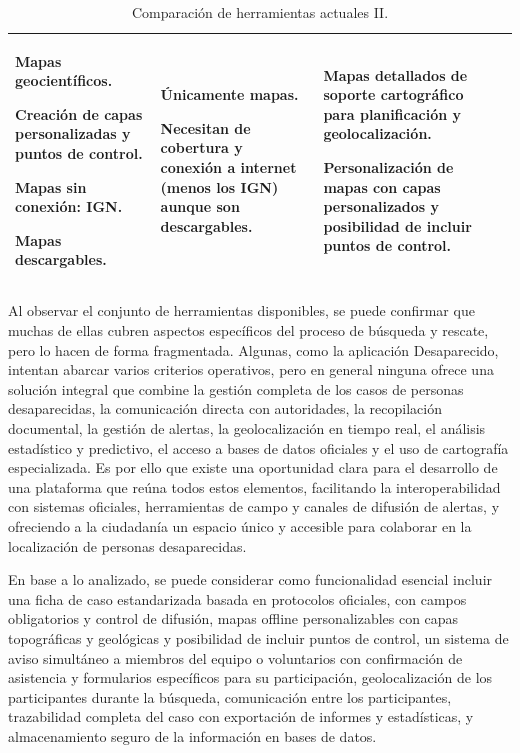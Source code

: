 \begin{table}[htbp]
\begin{tabular}{ |m{2cm}|m{5cm}|m{4cm}|m{3cm}|  }
{    Mapas geocientíficos.
    
    Creación de capas personalizadas y puntos de control.
    
    Mapas sin conexión: IGN.
    
    Mapas descargables.
    } 
    & {Únicamente mapas.
    
    Necesitan de cobertura y conexión a internet (menos los IGN) aunque son descargables.
    } 
    & {Mapas detallados de soporte cartográfico para planificación y geolocalización.
    
    Personalización de mapas con capas personalizados y posibilidad de incluir puntos de control.
    }\\
\hline
\end{tabular}
\caption{Comparación de herramientas actuales II.\label{tabla:TablaComparativaII}
}
\end{table}

    Al observar el conjunto de herramientas disponibles, se puede confirmar que muchas de ellas cubren aspectos específicos del proceso de búsqueda y rescate, pero lo hacen de forma fragmentada. Algunas, como la aplicación Desaparecido, intentan abarcar varios criterios operativos, pero en general ninguna ofrece una solución integral que combine la gestión completa de los casos de personas desaparecidas, la comunicación directa con autoridades, la recopilación documental, la gestión de alertas, la geolocalización en tiempo real, el análisis estadístico y predictivo, el acceso a bases de datos oficiales y el uso de cartografía especializada. Es por ello que existe una oportunidad clara para el desarrollo de una plataforma que reúna todos estos elementos, facilitando la interoperabilidad con sistemas oficiales, herramientas de campo y canales de difusión de alertas, y ofreciendo a la ciudadanía un espacio único y accesible para colaborar en la localización de personas desaparecidas.
    
    En base a lo analizado, se puede considerar como funcionalidad esencial incluir una ficha de caso estandarizada basada en protocolos oficiales, con campos obligatorios y control de difusión, mapas offline personalizables con capas topográficas y geológicas y posibilidad de incluir puntos de control, un sistema de aviso simultáneo a miembros del equipo o voluntarios con confirmación de asistencia y formularios específicos para su participación, geolocalización de los participantes durante la búsqueda, comunicación entre los participantes, trazabilidad completa del caso con exportación de informes y estadísticas, y almacenamiento seguro de la información en bases de datos. 
    
